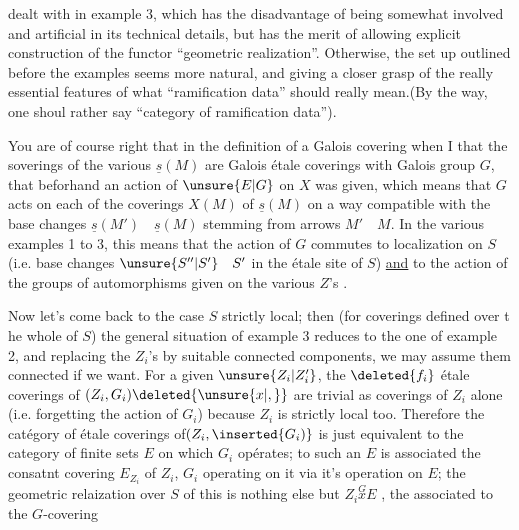 dealt with in example 3, which has the disadvantage of being somewhat involved and artificial in its technical details, but has the merit of allowing explicit construction of the functor ``geometric realization''. Otherwise, the set up outlined before the examples seems more natural, and giving a closer grasp of the  really essential features of what ``ramification data'' should really mean.(By the way, one shoul rather say ``category of ramification data'').

You are of course right that in the definition of a Galois covering when I  that the soverings of the various $\underline{s}(M)$ are Galois étale coverings with Galois group $G$, that beforhand an action of $\unsure{E|G}$ on $X$ was given, which means that $G$ acts on each of the coverings $X(M)$ of $\underline{s}(M)$ on a way compatible with the base changes $\underline{s}(M')\quad\underline{s}(M)$ stemming from arrows  $M'\quad M$. In the various examples 1 to 3, this means that the action of $G$ commutes to  localization on $S$ (i.e. base changes $\unsure{S''|S'}\quad S'$ in the étale site of $S$) \uline{and} to the action of the groups of automorphisms given on the various $Z$'s .

Now let's come back to the case $S$ strictly local; then (for coverings defined over t he whole of $S$) the general situation of example 3 reduces to the one of example 2, and replacing the $Z_i$'s by suitable connected components, we may assume them connected if we want. For a given $\unsure{Z_i|Z_i'}$, the $\deleted{f_i}$ étale coverings of $(Z_i,G_i)\deleted{\unsure{x|,}}$ are trivial as coverings of $Z_i$ alone (i.e. forgetting the action of $G_i$) because $Z_i$ is strictly local too. Therefore the catégory of étale coverings of$(Z_i,\inserted{G_i)}$ is just equivalent to the category of finite sets $E$ on which $G_i$ opérates; to such an $E$ is associated the consatnt covering $E_{Z_i}$ of $Z_i$,  $G_i$ operating on it via it's operation on $E$; the geometric relaization over $S$ of this is nothing else but $Z_i\overset{G}{x}E$ , the  associated to the $G$-covering
